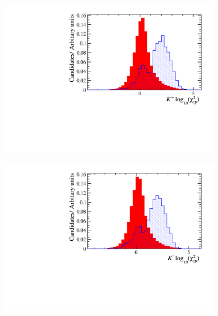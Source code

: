 \begin{figure}[!h]
\begin{subfigure}[t]{0.22\textwidth}
   \end{subfigure}
   \begin{subfigure}[t]{0.22\textwidth}
      \centering
      \includegraphics[width=1.0\textwidth]{figs/Selection/Phi_BDT_Var_Ds2KKPi_log10_Phi_K0_IPCHI2_OWNPV.pdf}
   \end{subfigure}
   \begin{subfigure}[t]{0.22\textwidth}
      \centering
      \includegraphics[width=1.0\textwidth]{figs/Selection/Phi_BDT_Var_Ds2KKPi_log10_Phi_K1_IPCHI2_OWNPV.pdf}
   \end{subfigure}
   \begin{subfigure}[t]{0.22\textwidth}
      \centering

\end{subfigure}
\end{figure}
